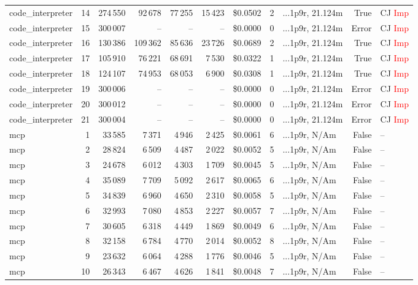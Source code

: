 \documentclass[a4paper,11pt]{article}
\begin{document}
\begin{table}[H]
{\begin{tabular}{l r r r r r r r l r l}
code\_interpreter & 14 & 274\,550 & 92\,678 & 77\,255 & 15\,423 & \$0.0502 & 2 & ...1p9r, 21.124m & True & CJ \textcolor{red}{Imp} \\
code\_interpreter & 15 & 300\,007 & -- & -- & -- & \$0.0000 & 0 & ...1p9r, 21.124m & Error & CJ \textcolor{red}{Imp} \\
code\_interpreter & 16 & 130\,386 & 109\,362 & 85\,636 & 23\,726 & \$0.0689 & 2 & ...1p9r, 21.124m & True & CJ \textcolor{red}{Imp} \\
code\_interpreter & 17 & 105\,910 & 76\,221 & 68\,691 & 7\,530 & \$0.0322 & 1 & ...1p9r, 21.124m & True & CJ \textcolor{red}{Imp} \\
code\_interpreter & 18 & 124\,107 & 74\,953 & 68\,053 & 6\,900 & \$0.0308 & 1 & ...1p9r, 21.124m & True & CJ \textcolor{red}{Imp} \\
code\_interpreter & 19 & 300\,006 & -- & -- & -- & \$0.0000 & 0 & ...1p9r, 21.124m & Error & CJ \textcolor{red}{Imp} \\
code\_interpreter & 20 & 300\,012 & -- & -- & -- & \$0.0000 & 0 & ...1p9r, 21.124m & Error & CJ \textcolor{red}{Imp} \\
code\_interpreter & 21 & 300\,004 & -- & -- & -- & \$0.0000 & 0 & ...1p9r, 21.124m & Error & CJ \textcolor{red}{Imp} \\
\midrule
mcp & 1 & 33\,585 & 7\,371 & 4\,946 & 2\,425 & \$0.0061 & 6 & ...1p9r, N/Am & False & -- \\
mcp & 2 & 28\,824 & 6\,509 & 4\,487 & 2\,022 & \$0.0052 & 5 & ...1p9r, N/Am & False & -- \\
mcp & 3 & 24\,678 & 6\,012 & 4\,303 & 1\,709 & \$0.0045 & 5 & ...1p9r, N/Am & False & -- \\
mcp & 4 & 35\,089 & 7\,709 & 5\,092 & 2\,617 & \$0.0065 & 6 & ...1p9r, N/Am & False & -- \\
mcp & 5 & 34\,839 & 6\,960 & 4\,650 & 2\,310 & \$0.0058 & 5 & ...1p9r, N/Am & False & -- \\
mcp & 6 & 32\,993 & 7\,080 & 4\,853 & 2\,227 & \$0.0057 & 7 & ...1p9r, N/Am & False & -- \\
mcp & 7 & 30\,605 & 6\,318 & 4\,449 & 1\,869 & \$0.0049 & 6 & ...1p9r, N/Am & False & -- \\
mcp & 8 & 32\,158 & 6\,784 & 4\,770 & 2\,014 & \$0.0052 & 8 & ...1p9r, N/Am & False & -- \\
mcp & 9 & 23\,632 & 6\,064 & 4\,288 & 1\,776 & \$0.0046 & 5 & ...1p9r, N/Am & False & -- \\
mcp & 10 & 26\,343 & 6\,467 & 4\,626 & 1\,841 & \$0.0048 & 7 & ...1p9r, N/Am & False & -- \\

\end{tabular}}
\end{table}
\end{document}
